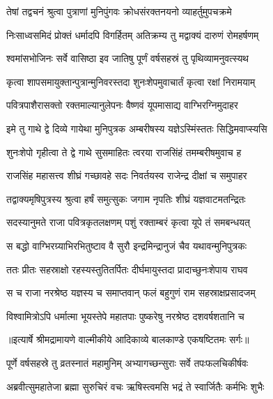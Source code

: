 \twolineshloka
{तेषां तद्वचनं श्रुत्वा पुत्राणां मुनिपुंगवः}
{क्रोधसंरक्तनयनो व्याहर्तुमुपचक्रमे} %

\twolineshloka
{निःसाध्वसमिदं प्रोक्तं धर्मादपि विगर्हितम्}
{अतिक्रम्य तु मद्वाक्यं दारुणं रोमहर्षणम्} %

\twolineshloka
{श्वमांसभोजिनः सर्वे वासिष्ठा इव जातिषु}
{पूर्णं वर्षसहस्रं तु पृथिव्यामनुवत्स्यथ} %

\twolineshloka
{कृत्वा शापसमायुक्तान्पुत्रान्मुनिवरस्तदा}
{शुनःशेपमुवाचार्तं कृत्वा रक्षां निरामयाम्} %

\twolineshloka
{पवित्रपाशैरासक्तो रक्तमाल्यानुलेपनः}
{वैष्णवं यूपमासाद्य वाग्भिरग्निमुदाहर} %

\twolineshloka
{इमे तु गाथे द्वे दिव्ये गायेथा मुनिपुत्रक}
{अम्बरीषस्य यज्ञेऽस्मिंस्ततः सिद्धिमवाप्स्यसि} %

\twolineshloka
{शुनःशेपो गृहीत्वा ते द्वे गाथे सुसमाहितः}
{त्वरया राजसिंहं तमम्बरीषमुवाच ह} %

\twolineshloka
{राजसिंह महासत्त्व शीघ्रं गच्छावहे सदः}
{निवर्तयस्व राजेन्द्र दीक्षां च समुपाहर} %

\twolineshloka
{तद्वाक्यमृषिपुत्रस्य श्रुत्वा हर्षं समुत्सुकः}
{जगाम नृपतिः शीघ्रं यज्ञवाटमतन्द्रितः} %

\twolineshloka
{सदस्यानुमते राजा पवित्रकृतलक्षणम्}
{पशुं रक्ताम्बरं कृत्वा यूपे तं समबन्धयत्} %

\twolineshloka
{स बद्धो वाग्भिरग्र्याभिरभितुष्टाव वै सुरौ}
{इन्द्रमिन्द्रानुजं चैव यथावन्मुनिपुत्रकः} %

\twolineshloka
{ततः प्रीतः सहस्राक्षो रहस्यस्तुतितर्पितः}
{दीर्घमायुस्तदा प्रादाच्छुनःशेपाय राघव} %

\twolineshloka
{स च राजा नरश्रेष्ठ यज्ञस्य च समाप्तवान्}
{फलं बहुगुणं राम सहस्राक्षप्रसादजम्} %

\twolineshloka
{विश्वामित्रोऽपि धर्मात्मा भूयस्तेपे महातपाः}
{पुष्करेषु नरश्रेष्ठ दशवर्षशतानि च} %


{॥इत्यार्षे श्रीमद्रामायणे वाल्मीकीये आदिकाव्ये बालकाण्डे एकषष्टितमः सर्गः॥}


\twolineshloka
{पूर्णे वर्षसहस्रे तु व्रतस्नातं महामुनिम्}
{अभ्यागच्छन्सुराः सर्वे तपःफलचिकीर्षवः} %

\twolineshloka
{अब्रवीत्सुमहातेजा ब्रह्मा सुरुचिरं वचः}
{ऋषिस्त्वमसि भद्रं ते स्वार्जितैः कर्मभिः शुभैः} %


